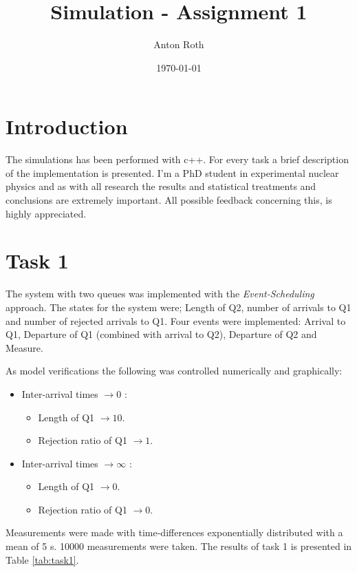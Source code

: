 \documentclass[]{article}
\title{Simulation - Assignment 1}
\author{Anton Roth}
\date{\today}
\begin{document}
\begin{titlepage}
  \maketitle
  \thispagestyle{empty}
\end{titlepage}

\section*{Introduction}
The simulations has been performed with c++.
For every task a brief description of the implementation is presented.
I'm a PhD student in experimental nuclear physics and as with all research the results and statistical treatments and conclusions are extremely important. All possible feedback concerning this, is highly appreciated.

\section{Task 1}
The system with two queues was implemented with the {\it Event-Scheduling} approach. The states for the system were; Length of Q2, number of arrivals to Q1 and number of rejected arrivals to Q1. Four events were implemented: Arrival to Q1, Departure of Q1 (combined with arrival to Q2), Departure of Q2 and Measure.

As model verifications the following was controlled numerically and graphically:
\begin{itemize}
  \item Inter-arrival times $\rightarrow 0$ :
    \begin{itemize}
      \item Length of Q1 $\rightarrow 10$.
      \item Rejection ratio of Q1 $\rightarrow 1$.
    \end{itemize}
  \item Inter-arrival times $\rightarrow \infty$ :
    \begin{itemize}
      \item Length of Q1 $\rightarrow 0$.
      \item Rejection ratio of Q1 $\rightarrow 0$.
    \end{itemize}
\end{itemize}

Measurements were made with time-differences exponentially distributed with a mean of 5 s. 10000 measurements were taken. The results of task 1 is presented in Table \ref{tab:task1}.
\end{document}
